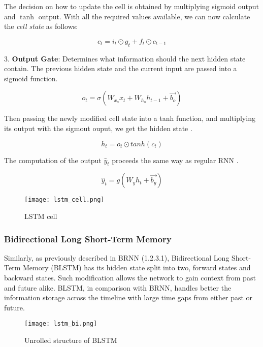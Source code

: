 The decision on how to update the cell is obtained by multiplying sigmoid output and $\tanh$ output. With all the required values available, we can now calculate the \textit{cell state} as follows:

\begin{equation}
    {c_t = i_t \odot g_t + f_t \odot c_{t-1}}
\end{equation}


3. \textbf{Output Gate}: Determines what information should the next hidden state contain. The previous hidden state and the current input are passed into a sigmoid function.

\begin{equation}
    {o_t = \sigma(W_{x_o}x_t + W_{h_o}h_{t-1}+\vec{b_o})}
\end{equation}

Then passing the newly modified cell state into a tanh function, and multiplying its output with the sigmout ouput, we get the hidden state \cite{guideLSTM}.

\begin{equation}
    {h_t = o_t \odot tanh(c_t)}
\end{equation}


The computation of the output $\hat{y}_t$ proceeds the same way as regular RNN \cite{matous}.

\begin{equation}
    {\hat{y}_t = g(W_{y}h_t + \vec{b_y})}
\end{equation}

\begin{figure}[h]
	\centering
    \texttt{[image: lstm\_cell.png]}
	\caption{LSTM cell \cite{lstmcell_img}}
	\label{fig:lstmCell}
\end{figure}

\subsubsection{Bidirectional Long Short-Term Memory}

Similarly, as previously described in BRNN (1.2.3.1), Bidirectional Long Short-Term Memory (BLSTM) has its hidden state split into two, forward states and backward states. Such modification allows the network to gain context from past and future alike. BLSTM, in comparison with BRNN, handles better the information storage across the timeline with large time gaps from either past or future.

\begin{figure}[h]
	\centering
    \texttt{[image: lstm\_bi.png]}
	\caption{Unrolled structure of BLSTM \cite{matous}}
	\label{fig:blstm}
\end{figure}

